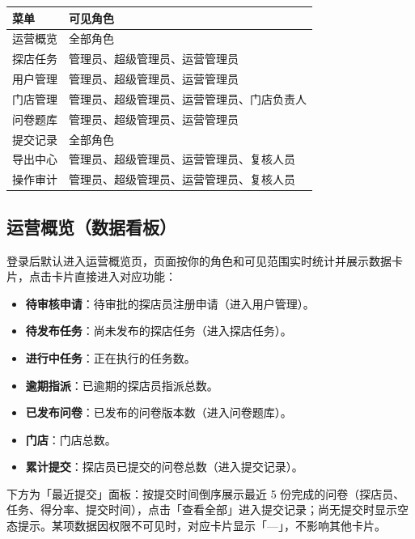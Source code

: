 \documentclass[12pt,a4paper,fontset=none]{ctexart}
\begin{document}
\begin{center}
\begin{tabular}{ll}
\toprule
菜单 & 可见角色 \\
\midrule
运营概览 & 全部角色 \\
探店任务 & 管理员、超级管理员、运营管理员 \\
用户管理 & 管理员、超级管理员、运营管理员 \\
门店管理 & 管理员、超级管理员、运营管理员、门店负责人 \\
问卷题库 & 管理员、超级管理员、运营管理员 \\
提交记录 & 全部角色 \\
导出中心 & 管理员、超级管理员、运营管理员、复核人员 \\
操作审计 & 管理员、超级管理员、运营管理员、复核人员 \\
\bottomrule
\end{tabular}
\end{center}


\subsection{运营概览（数据看板）}
登录后默认进入运营概览页，页面按你的角色和可见范围实时统计并展示数据卡片，点击卡片直接进入对应功能：

\begin{itemize}
\item \textbf{待审核申请}：待审批的探店员注册申请（进入用户管理）。
\item \textbf{待发布任务}：尚未发布的探店任务（进入探店任务）。
\item \textbf{进行中任务}：正在执行的任务数。
\item \textbf{逾期指派}：已逾期的探店员指派总数。
\item \textbf{已发布问卷}：已发布的问卷版本数（进入问卷题库）。
\item \textbf{门店}：门店总数。
\item \textbf{累计提交}：探店员已提交的问卷总数（进入提交记录）。
\end{itemize}

下方为「最近提交」面板：按提交时间倒序展示最近 5 份完成的问卷（探店员、任务、得分率、提交时间），点击「查看全部」进入提交记录；尚无提交时显示空态提示。某项数据因权限不可见时，对应卡片显示「—」，不影响其他卡片。
\end{document}
